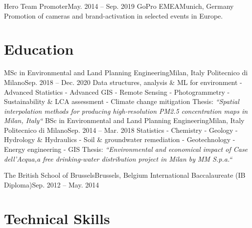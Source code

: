 \documentclass[letterpaper,11pt]{article}
\begin{document}
\sectionElement
{Hero Team Promoter}{May. 2014 -- Sep. 2019}
{GoPro EMEA}{Munich, Germany}
{Promotion of cameras and brand-activation in selected events in Europe.}
{}
\sectionElementListEnd


\section{Education}
\sectionElementListStart

\sectionElement
{MSc in Environmental and Land Planning Engineering}{Milan, Italy}
{Politecnico di Milano}{Sep. 2018 -- Dec. 2020}
{\scriptsize Data structures, analysis \& ML for environment - Advanced Statistics - Advanced GIS -
  Remote Sensing - Photogrammetry -
  Sustainability \& LCA assessment - Climate change mitigation\newline
  {\scriptsize Thesis: \it “Spatial interpolation methods for producing high-resolution PM2.5 concentration maps in Milan, Italy“}}
{}
\sectionElement
{BSc in Environmental and Land Planning Engineering}{Milan, Italy}
{Politecnico di Milano}{Sep. 2014 -- Mar. 2018}
{\scriptsize Statistics - Chemistry - Geology - Hydrology \& Hydraulics
  - Soil \& groundwater remediation - Geotechnology - Energy engineering - GIS\newline
  {\scriptsize Thesis: \it “Environmental and economical impact of Case dell'Acqua,a free drinking-water distribution project in Milan by MM S.p.a.“}}
{}

\sectionElement
{The British School of Brussels}{Brussels, Belgium}
{International Baccalaureate (IB Diploma)}{Sep. 2012 -- May. 2014}
{}{}

\sectionElementListEnd

\section{Technical Skills}
\end{document}
